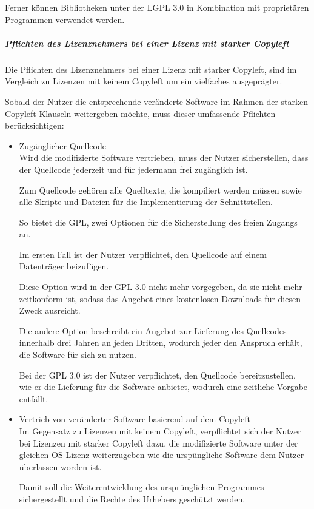 Ferner können Bibliotheken unter der LGPL 3.0 in Kombination mit proprietären Programmen verwendet werden. 

\subparagraph{Pflichten des Lizenznehmers bei einer Lizenz mit starker Copyleft}
Die Pflichten des Lizenznehmers bei einer Lizenz mit starker Copyleft, sind im Vergleich zu Lizenzen mit keinem Copyleft um ein vielfaches ausgeprägter. 

Sobald der Nutzer die entsprechende veränderte Software im Rahmen der starken Copyleft-Klauseln weitergeben möchte, muss dieser umfassende Pflichten berücksichtigen: 

\begin{itemize}
    \item Zugänglicher Quellcode\\
    Wird die modifizierte Software vertrieben, muss der Nutzer sicherstellen, dass der Quellcode jederzeit und für jedermann frei zugänglich ist. 

    Zum Quellcode gehören alle Quelltexte, die kompiliert werden müssen sowie alle Skripte und Dateien für die Implementierung der Schnittstellen. 

    So bietet die GPL, zwei Optionen für die Sicherstellung des freien Zugangs an. 

    Im ersten Fall ist der Nutzer verpflichtet, den Quellcode auf einem Datenträger beizufügen. 

    Diese Option wird in der GPL 3.0 nicht mehr vorgegeben, da sie nicht mehr zeitkonform ist, sodass das Angebot eines kostenlosen Downloads für diesen Zweck ausreicht. 

    Die andere Option beschreibt ein Angebot zur Lieferung des Quellcodes innerhalb drei Jahren an jeden Dritten, wodurch jeder den Anspruch erhält, die Software für sich zu nutzen. 

    Bei der GPL 3.0 ist der Nutzer verpflichtet, den Quellcode bereitzustellen, wie er die Lieferung für die Software anbietet, wodurch eine zeitliche Vorgabe entfällt. 

    \item Vertrieb von veränderter Software basierend auf dem Copyleft\\
    Im Gegensatz zu Lizenzen mit keinem Copyleft, verpflichtet sich der Nutzer bei Lizenzen mit starker Copyleft dazu, die modifizierte Software unter der gleichen OS-Lizenz weiterzugeben wie die urspüngliche Software dem Nutzer überlassen worden ist. 
    
    Damit soll die Weiterentwicklung des ursprünglichen Programmes sichergestellt und die Rechte des Urhebers geschützt werden. 


\end{itemize}
